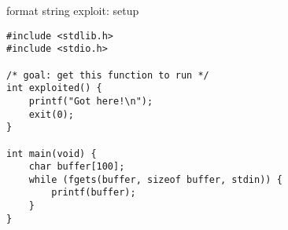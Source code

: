 
\begin{frame}[fragile,label=formatSetup]{format string exploit: setup}
\lstset{
    language=C,
    style=small,
}
\begin{lstlisting}
#include <stdlib.h>
#include <stdio.h>

/* goal: get this function to run */
int exploited() {
    printf("Got here!\n");
    exit(0);
}

int main(void) {
    char buffer[100];
    while (fgets(buffer, sizeof buffer, stdin)) {
        printf(buffer);
    }
}
\end{lstlisting}
\end{frame}

